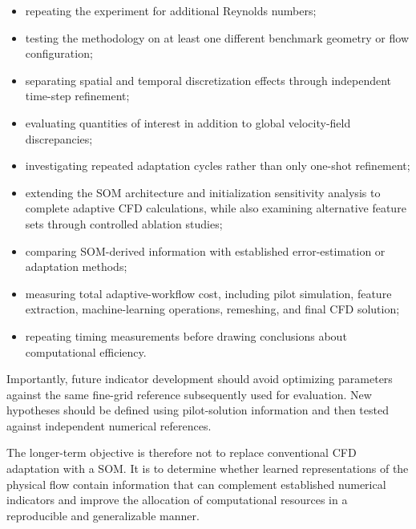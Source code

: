 \begin{itemize}

    \item repeating the experiment for additional Reynolds numbers;

    \item testing the methodology on at least one different benchmark
    geometry or flow configuration;

    \item separating spatial and temporal discretization effects through
    independent time-step refinement;

    \item evaluating quantities of interest in addition to global
    velocity-field discrepancies;

    \item investigating repeated adaptation cycles rather than only
    one-shot refinement;

    \item extending the SOM architecture and initialization sensitivity
    analysis to complete adaptive CFD calculations, while also examining
    alternative feature sets through controlled ablation studies;

    \item comparing SOM-derived information with established
    error-estimation or adaptation methods;

    \item measuring total adaptive-workflow cost, including pilot
    simulation, feature extraction, machine-learning operations,
    remeshing, and final CFD solution;

    \item repeating timing measurements before drawing conclusions about
    computational efficiency.

\end{itemize}

Importantly, future indicator development should avoid optimizing
parameters against the same fine-grid reference subsequently used for
evaluation. New hypotheses should be defined using pilot-solution
information and then tested against independent numerical references.

The longer-term objective is therefore not to replace conventional CFD
adaptation with a SOM. It is to determine whether learned representations
of the physical flow contain information that can complement established
numerical indicators and improve the allocation of computational
resources in a reproducible and generalizable manner.
